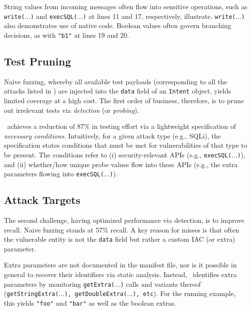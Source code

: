 String values from incoming messages often flow into sensitive operations, such as {\tt write($\ldots$)} and {\tt execSQL($\ldots$)} at lines 11 and 17, respectively, illustrate. {\tt write($\ldots$)} also demonstrates use of native code.	Boolean values often govern branching decisions, as with {\tt "b1"} at lines 19 and 20.

\subsection{Test Pruning}

Naive fuzzing, whereby all available test payloads (corresponding to all the attacks listed in ) are injected into the {\tt data} field of an {\tt Intent} object, 
yields limited coverage at a high cost. The first order of business, therefore, is to prune out irrelevant tests via \emph{detection} (or \emph{probing}). 

\Tool\ achieves a reduction of 87\% in testing effort via a lightweight specification of \emph{necessary conditions}. Intuitively, for a given attack type (e.g., SQLi), the specification states conditions that must be met for vulnerabilities of that type to be present. The conditions refer to (i) security-relevant APIs (e.g., {\tt execSQL($\ldots$)}), and (ii) whether/how unique probe values flow into these APIs (e.g., the extra parameters flowing into {\tt execSQL($\ldots$)}).

\subsection{Attack Targets}

The second challenge, having optimized performance via detection, is to improve recall. Naive fuzzing stands at 57\% recall. A key reason for misses is that often the vulnerable entity is not the 
{\tt data} field but rather a custom IAC (or extra) parameter.

Extra parameters are not documented in the manifest file, nor is it possible in general to recover their identifiers via static analysis. Instead, \Tool\ identifies extra parameters by monitoring {\tt getExtra($\ldots$)} calls and variants thereof ({\tt getStringExtra($\ldots$), getDoubleExtra($\ldots$), etc}). For the running example, this yields {\tt "foo"} and {\tt "bar"} as well as the boolean extras.
%

